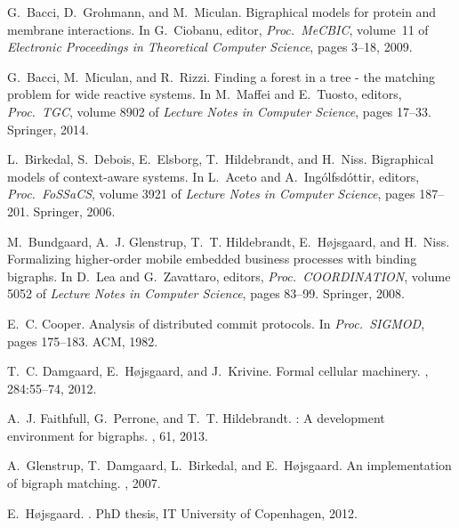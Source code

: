 \documentclass[a4paper,english,10pt]{article}
\theoremstyle{plain}\newtheorem{theorem}{Theorem}
\theoremstyle{plain}\newtheorem{corollary}[theorem]{Corollary}
\theoremstyle{plain}\newtheorem{proposition}[theorem]{Proposition}
\theoremstyle{plain}\newtheorem{lemma}[theorem]{Lemma}
\theoremstyle{plain}\newtheorem{definition}{Definition}
\theoremstyle{plain}\newtheorem{remark}{Remark}
\theoremstyle{plain}\newtheorem{example}[remark]{Example}
\newcommand{\?}[1]{}
\begin{document}
{\small
\begin{thebibliography}{10}

G.~Bacci, D.~Grohmann, and M.~Miculan.
\newblock Bigraphical models for protein and membrane interactions.
\newblock In G.~Ciobanu, editor, {\em Proc.~MeCBIC}, volume~11 of {\em
  Electronic Proceedings in Theoretical Computer Science}, pages 3--18, 2009.

G.~Bacci, M.~Miculan, and R.~Rizzi.
\newblock Finding a forest in a tree - the matching problem for wide reactive
  systems.
\newblock In M.~Maffei and E.~Tuosto, editors, {\em Proc.~TGC}, volume 8902 of
  {\em Lecture Notes in Computer Science}, pages 17--33. Springer, 2014.

L.~Birkedal, S.~Debois, E.~Elsborg, T.~Hildebrandt, and H.~Niss.
\newblock Bigraphical models of context-aware systems.
\newblock In L.~Aceto and A.~Ing{\'o}lfsd{\'o}ttir, editors, {\em
  Proc.~FoSSaCS}, volume 3921 of {\em Lecture Notes in Computer Science}, pages
  187--201. Springer, 2006.

M.~Bundgaard, A.~J. Glenstrup, T.~T. Hildebrandt, E.~H{\o}jsgaard, and H.~Niss.
\newblock Formalizing higher-order mobile embedded business processes with
  binding bigraphs.
\newblock In D.~Lea and G.~Zavattaro, editors, {\em Proc.~COORDINATION}, volume
  5052 of {\em Lecture Notes in Computer Science}, pages 83--99. Springer,
  2008.

E.~C. Cooper.
\newblock Analysis of distributed commit protocols.
\newblock In {\em Proc.~SIGMOD}, pages 175--183. ACM, 1982.

T.~C. Damgaard, E.~H{\o}jsgaard, and J.~Krivine.
\newblock Formal cellular machinery.
, 284:55--74,
  2012.

A.~J. Faithfull, G.~Perrone, and T.~T. Hildebrandt.
: A development environment for bigraphs.
, 61, 2013.

A.~Glenstrup, T.~Damgaard, L.~Birkedal, and E.~H{\o}jsgaard.
\newblock An implementation of bigraph matching.
, 2007.

E.~H{\o}jsgaard.
.
\newblock PhD thesis, IT University of Copenhagen, 2012.


\end{thebibliography}}
\end{document}
